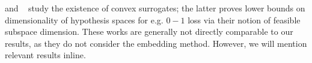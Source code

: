 \documentclass[anon,12pt]{colt2019}
\newcommand{\Comments}{1}
\newcommand{\mytodo}[2]{\ifnum\Comments=1%
  \todo[linecolor=#1!80!black,backgroundcolor=#1,bordercolor=#1!80!black]{#2}\fi}
\newcommand{\jessiet}[1]{\mytodo{purple!20!white}{JF: #1}}
\newcommand{\eliccvx}{\mathrm{elic}_\mathrm{cvx}}
\DeclarePairedDelimiter\ceil{\lceil}{\rceil}
\begin{document}
%
%
  \cite{agarwal2015consistent} and ~\cite{ramaswamy2016convex} study the existence of convex surrogates; the latter proves lower bounds on dimensionality of hypothesis spaces for e.g. $0-1$ loss via their notion of feasible subspace dimension.
  These works are generally not directly comparable to our results, as they do not consider the embedding method.
  However, we will mention relevant results inline.
\end{document}
